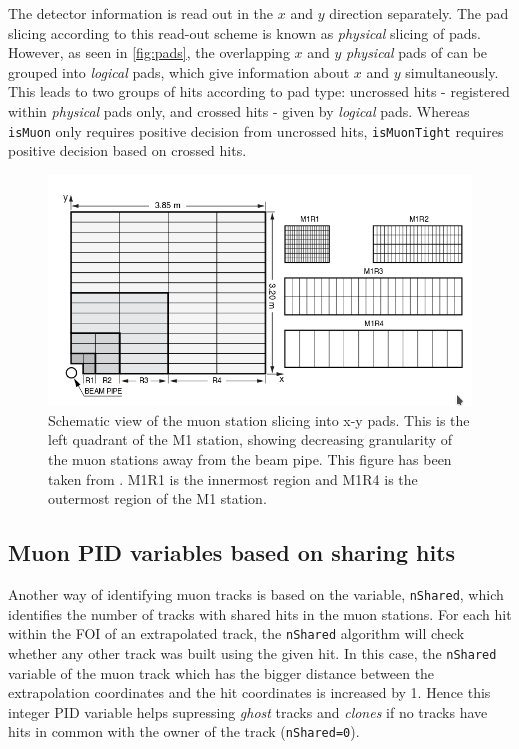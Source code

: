 \color{black}

The detector information is read out in the $x$ and $y$ direction separately. The pad slicing according to this read-out scheme is known as \textit{physical} slicing of pads. However, as seen in \autoref{fig:pads}, the overlapping $x$ and $y$ \textit{physical} pads of can be grouped into \textit{logical} pads, which give information about $x$ and $y$ simultaneously. This leads to two groups of hits according to pad type: uncrossed hits - registered within \textit{physical} pads only, and crossed hits - given by \textit{logical} pads. Whereas \texttt{isMuon} only requires positive decision from uncrossed hits, \texttt{isMuonTight} requires positive decision based on crossed hits. 


\begin{figure}[!h]
        \centering
        \includegraphics[width = 1.0\textwidth]{figs/trimuon/pad.png}
        \caption{Schematic view of the muon station slicing into x-y pads. This is the left quadrant of the M1 station, showing decreasing granularity of the muon stations away from the beam pipe. This figure has been taken from \cite{LHCb-DP-2012-002}. M1R1 is the innermost region and M1R4 is the outermost region of the M1 station. }
        \label{fig:pads}
\end{figure}

\subsection{Muon PID variables based on sharing hits }
\label{bugs}

Another way of identifying muon tracks is based on the variable, \texttt{nShared}, which identifies the number of tracks with shared hits in the muon stations. For each hit within the \gls{FOI} of an extrapolated track, the \texttt{nShared} algorithm will check whether any other track was built using the given hit. In this case, the \texttt{nShared} variable of the muon track which has the bigger distance between the extrapolation coordinates and the hit coordinates is increased by 1. Hence this integer \gls{PID} variable helps supressing \textit{ghost} tracks and \textit{clones} if no tracks have hits in common with the owner of the track (\texttt{nShared=0}).

